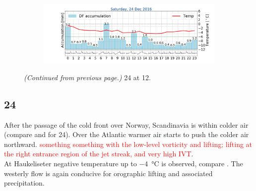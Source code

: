 \begin{figure}
	\begin{subfigure}[b]{0.49\textwidth}
		\includegraphics[trim={4.9cm 1.cm 1.5cm 1cm},clip,
		width=\textwidth]{./fig_weathermast/T_P_U_20161224}
		\caption{} \label{fig:TPU24}
	\end{subfigure}
	\caption{\textit{(Continued from previous page.)} \SI{24}{\dec} at \SI{12}{\UTC}.}
\end{figure}
\subsection*{\SI{24}{\dec}}
\noindent After the passage of the cold front over Norway, Scandinavia is within colder air (compare  and  for \SI{24}{\dec}). Over the Atlantic warmer air starts to push the colder air northward. \textcolor{red}{something something with the low-level vorticity and lifting; lifting at the right entrance region of the jet streak, and very high IVT}.
\\
At Haukeliseter negative temperature up to \SI{-4}{\celsius} is observed, compare . The westerly flow is again conducive for orographic lifting and associated precipitation.

